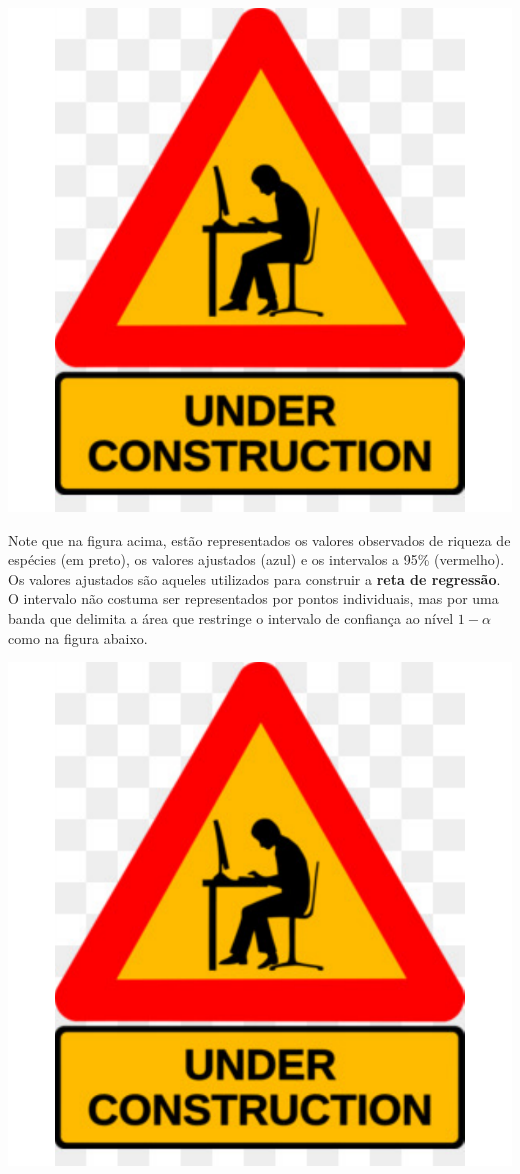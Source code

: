 \documentclass[
]{book}
\begin{document}
\begin{center}\includegraphics{probest-cambientais_files/figure-latex/unnamed-chunk-164-1} \end{center}

Note que na figura acima, estão representados os valores observados de riqueza de espécies (em preto), os valores ajustados (azul) e os intervalos a 95\% (vermelho). Os valores ajustados são aqueles utilizados para construir a \textbf{reta de regressão}. O intervalo não costuma ser representados por pontos individuais, mas por uma banda que delimita a área que restringe o intervalo de confiança ao nível \(1 - \alpha\) como na figura abaixo.

\begin{center}\includegraphics{probest-cambientais_files/figure-latex/unnamed-chunk-165-1} \end{center}
\end{document}
